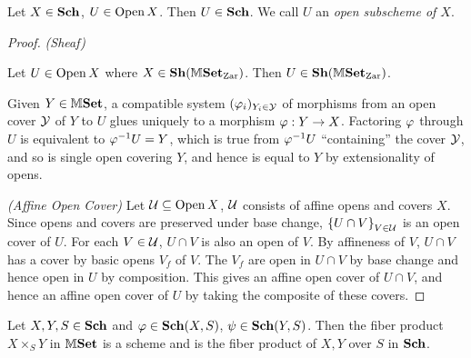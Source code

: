 \documentclass[../main.tex]{subfiles}
\begin{document}
\begin{prop}
  
  Let $X \in \mathbf{Sch}$, $U \in \operatorname{Open} X$.
  Then $U \in \mathbf{Sch}$.
  We call $U$ an \emph{open subscheme of $X$}.
\end{prop}
\begin{proof}
  
  \textit{(Sheaf)}
  \begin{lem}
  
    Let $U \in \operatorname{Open} X$ where $X \in \mathbf{Sh}(\mathbb{M}\mathbf{Set}_{\mathrm{Zar}})$.
    Then $U \in \mathbf{Sh}(\mathbb{M}\mathbf{Set}_{\mathrm{Zar}})$.
  \end{lem}
  \begin{proof1}
    Given $Y \in \mathbb{M}\mathbf{Set}$,
    a compatible system $(\varphi_i)_{Y_i \in \mathcal{Y}}$ of morphisms from 
    an open cover $\mathcal{Y}$ of $Y$ to $U$ glues uniquely to 
    a morphism $\varphi : Y \to X$.
    Factoring $\varphi$ through $U$ is equivalent to $\varphi^{-1} U = Y$,
    which is true from $\varphi^{-1} U$ ``containing'' the cover $\mathcal{Y}$,
    and so is single open covering $Y$, and hence is equal to $Y$
    by extensionality of opens. 
  \end{proof1}

  \textit{(Affine Open Cover)}
  Let $\mathcal{U} \subseteq \operatorname{Open} X$, $\mathcal{U}$ consists of affine opens and covers $X$.
  Since opens and covers are preserved under base change, 
  $\left\{U \cap V\right\}_{V \in \mathcal{U}}$ is an open cover of $U$.
  For each $V \in \mathcal{U}$, $U \cap V$ is also an open of $V$.
  By affineness of $V$, 
  $U \cap V$ has a cover by basic opens $V_f$ of $V$.
  The $V_f$ are open in $U \cap V$ by base change and 
  hence open in $U$ by composition. 
  This gives an affine open cover of $U \cap V$,
  and hence an affine open cover of $U$ by 
  taking the composite of these covers.

\end{proof}

\begin{prop}
  
  Let $X,Y,S \in \mathbf{Sch}$ and $\varphi \in \mathbf{Sch}(X,S)$, $\psi \in \mathbf{Sch}(Y,S)$.
  Then the fiber product $X\times_S Y$ in $\mathbb{M}\mathbf{Set}$ is a scheme
  and is the fiber product of $X,Y$ over $S$ in $\mathbf{Sch}$.
\end{prop}
\end{document}
